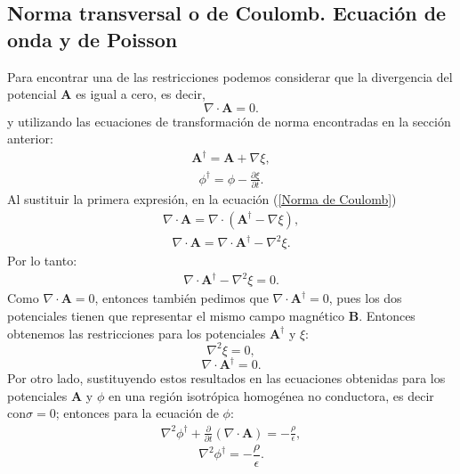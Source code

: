 \documentclass[11pt,fleqn]{book} %
\begin{document}
\subsection{Norma transversal o de Coulomb. Ecuaci\'on de onda y de Poisson}
Para encontrar una de las restricciones podemos considerar que la divergencia del potencial $\textbf{A}$ es igual a cero, es decir,
\begin{equation}
\nabla\cdot\textbf{A}=0.  \label{Norma de Coulomb}
\end{equation}
y utilizando las ecuaciones de transformaci\'on de norma encontradas en la secci\'on anterior:
\begin{eqnarray*}
\textbf{A}^{\dagger}=\textbf{A}+\nabla\xi,
\end{eqnarray*}
\begin{eqnarray*}
\phi^{\dagger}=\phi-\frac{\partial \xi}{\partial t}.
\end{eqnarray*}
Al sustituir la primera expresi\'on, en la ecuaci\'on (\ref{Norma de Coulomb})
\begin{eqnarray*}
\nabla\cdot\textbf{A}=\nabla\cdot\left(\textbf{A}^{\dagger}-\nabla\xi \right),
\end{eqnarray*}
\begin{eqnarray*}
\nabla\cdot\textbf{A}=\nabla\cdot\textbf{A}^{\dagger}-\nabla^{2}\xi.
\end{eqnarray*}
Por lo tanto:
\begin{eqnarray*}
\nabla\cdot\textbf{A}^{\dagger}-\nabla^{2}\xi=0.
\end{eqnarray*}
Como $\nabla \cdot \textbf{A}=0$, entonces tambi\'en pedimos que $\nabla \cdot \textbf{A}^{\dagger}=0$, pues los dos potenciales tienen que representar el mismo campo magn\'etico $\textbf{B}$. Entonces obtenemos las restricciones para los potenciales $\textbf{A}^{\dagger}$ y $\xi$:
\begin{equation}
\nabla^{2}\xi=0,
\end{equation}
\begin{equation}
\nabla \cdot \textbf{A}^{\dagger}=0.
\end{equation}
Por otro lado, sustituyendo estos resultados en las ecuaciones obtenidas para los potenciales $\textbf{A}$ y $\phi$ en una regi\'on isotr\'opica homog\'enea no conductora, es decir con$\sigma=0$; entonces para la ecuaci\'on de $\phi$:
\begin{eqnarray*}
\nabla^{2}\phi^{\dagger}+\frac{\partial }{\partial t}(\nabla\cdot\textbf{A})=-\frac{\rho}{\epsilon},
\end{eqnarray*}
\begin{equation}
\nabla^{2}\phi^{\dagger}=-\frac{\rho}{\epsilon}.
\end{equation}
\end{document}
